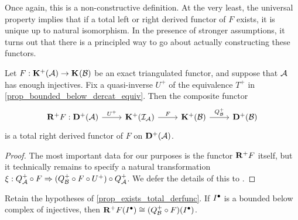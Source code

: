 Once again, this is a non-constructive definition.
At the very least, the universal property implies that if a total
left or right derived functor of $F$ exists, it is unique up to
natural isomorphism.
In the presence of stronger assumptions, it turns out that there is a
principled way to go about actually constructing these functors.

\begin{proposition}
  \label{prop_exists_total_derfunc}
  Let $F: \homcat[+]{\abcat{A}} \to \homcat{\abcat{B}}$ be an exact
  triangulated functor, and suppose that $\abcat{A}$ has enough injectives.
  Fix a quasi-inverse $U^+$ of the equivalence $T^+$ in
  \cref{prop_bounded_below_dercat_equiv}.
  Then the composite functor
  \[
    \begin{tikzcd}
      {\rightderfunc[+]{F}: {\dercat[+]{\abcat{A}}}} &
      {\homcat[+]{\abcat{I}_{\abcat{A}}}} & {\homcat[+]{\abcat{B}}} &
      {\dercat[+]{\abcat{B}}}
      \arrow["U^+", from=1-1, to=1-2]
      \arrow["F", from=1-2, to=1-3]
      \arrow["{\dercatlocln[+]{\abcat{B}}}", from=1-3, to=1-4]
    \end{tikzcd}
  \]
  is a total right derived functor of $F$ on ${\dercat[+]{\abcat{A}}}$.
  \iffalse
  Dually, given an exact triangulated functor $F:
  \homcat[-]{\abcat{A}} \to \homcat{\abcat{B}}$ and enough
  projectives in $\abcat{A}$, the composite functor
  \[
    \begin{tikzcd}
      {\leftderfunc[-]{F}: {\dercat[-]{\abcat{A}}}} &
      {\homcat[-]{\abcat{P}_{\abcat{A}}}} & {\homcat[-]{\abcat{B}}} &
      {\dercat[-]{\abcat{B}}}
      \arrow["\equiv", from=1-1, to=1-2]
      \arrow["F", from=1-2, to=1-3]
      \arrow["{\dercatlocln[-]{\abcat{B}}}", from=1-3, to=1-4]
    \end{tikzcd}
  \]
  is a total left derived functor of $F$.
  \fi
\end{proposition}

\begin{proof}
  The most important data for our purposes is the functor
  $\rightderfunc[+]{F}$ itself, but it technically remains to specify
  a natural transformation $\xi: \dercatlocln[+]{\abcat{A}} \circ F
  \nattrans (\dercatlocln[+]{\abcat{B}} \circ F \circ U^+) \circ
  \dercatlocln[+]{\abcat{A}}$.
  We defer the details of this to \cite[Theorem~10.5.6]{weibel}.
\end{proof}

\begin{corollary}
  \label{cor_derfunc_applied_to_proj_inj_complexes}
  Retain the hypotheses of \cref{prop_exists_total_derfunc}.
  If $\cochaincomp{I}$ is a bounded below complex of injectives, then
  $\rightderfunc[+]{F}(\cochaincomp{I}) \cong
  (\dercatlocln[+]{\abcat{B}} \circ F)(\cochaincomp{I})$.
\end{corollary}

